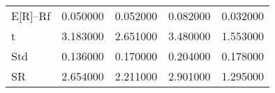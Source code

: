 \begin{tabular}{lrrrr}
\toprule
\midrule
E[R]--Rf & 0.050000 & 0.052000 & 0.082000 & 0.032000 \\
t & 3.183000 & 2.651000 & 3.480000 & 1.553000 \\
Std & 0.136000 & 0.170000 & 0.204000 & 0.178000 \\
SR & 2.654000 & 2.211000 & 2.901000 & 1.295000 \\
\bottomrule
\end{tabular}
